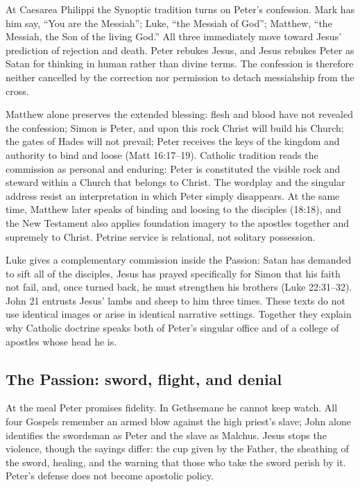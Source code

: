 At Caesarea Philippi the Synoptic tradition turns on Peter's confession.
Mark has him say, ``You are the Messiah''; Luke, ``the Messiah of God'';
Matthew, ``the Messiah, the Son of the living God.'' All three immediately
move toward Jesus' prediction of rejection and death. Peter rebukes Jesus,
and Jesus rebukes Peter as Satan for thinking in human rather than divine
terms. The confession is therefore neither cancelled by the correction nor
permission to detach messiahship from the cross.

Matthew alone preserves the extended blessing: flesh and blood have not
revealed the confession; Simon is Peter, and upon this rock Christ will build
his Church; the gates of Hades will not prevail; Peter receives the keys of
the kingdom and authority to bind and loose (Matt 16:17--19). Catholic
tradition reads the commission as personal and enduring: Peter is constituted
the visible rock and steward within a Church that belongs to Christ. The
wordplay and the singular address resist an interpretation in which Peter
simply disappears. At the same time, Matthew later speaks of binding and
loosing to the disciples (18:18), and the New Testament also applies
foundation imagery to the apostles together and supremely to Christ. Petrine
service is relational, not solitary possession.

Luke gives a complementary commission inside the Passion: Satan has demanded
to sift all of the disciples, Jesus has prayed specifically for Simon that his
faith not fail, and, once turned back, he must strengthen his brothers (Luke
22:31--32). John 21 entrusts Jesus' lambs and sheep to him three times. These
texts do not use identical images or arise in identical narrative settings.
Together they explain why Catholic doctrine speaks both of Peter's singular
office and of a college of apostles whose head he is.

\subsection{The Passion: sword, flight, and denial}

At the meal Peter promises fidelity. In Gethsemane he cannot keep watch. All
four Gospels remember an armed blow against the high priest's slave; John
alone identifies the swordsman as Peter and the slave as Malchus. Jesus stops
the violence, though the sayings differ: the cup given by the Father, the
sheathing of the sword, healing, and the warning that those who take the sword
perish by it. Peter's defense does not become apostolic policy.

